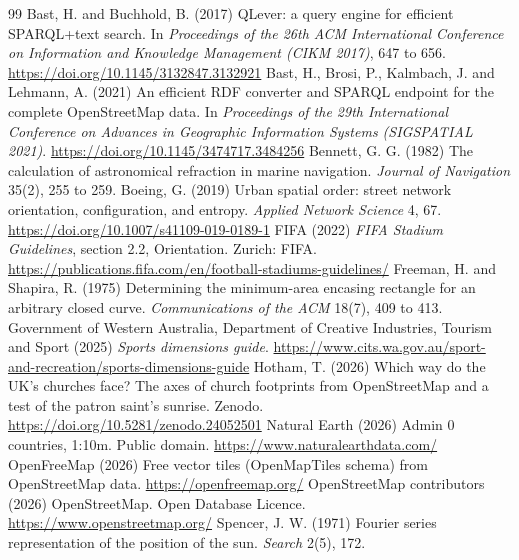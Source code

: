 \documentclass[11pt,a4paper]{article}
\begin{document}
\begin{thebibliography}{99}
 Bast, H. and Buchhold, B. (2017) QLever: a query engine for efficient SPARQL+text search. In \textit{Proceedings of the 26th ACM International Conference on Information and Knowledge Management (CIKM 2017)}, 647 to 656. \url{https://doi.org/10.1145/3132847.3132921}
 Bast, H., Brosi, P., Kalmbach, J. and Lehmann, A. (2021) An efficient RDF converter and SPARQL endpoint for the complete OpenStreetMap data. In \textit{Proceedings of the 29th International Conference on Advances in Geographic Information Systems (SIGSPATIAL 2021)}. \url{https://doi.org/10.1145/3474717.3484256}
 Bennett, G. G. (1982) The calculation of astronomical refraction in marine navigation. \textit{Journal of Navigation} 35(2), 255 to 259.
 Boeing, G. (2019) Urban spatial order: street network orientation, configuration, and entropy. \textit{Applied Network Science} 4, 67. \url{https://doi.org/10.1007/s41109-019-0189-1}
 FIFA (2022) \textit{FIFA Stadium Guidelines}, section 2.2, Orientation. Zurich: FIFA. \url{https://publications.fifa.com/en/football-stadiums-guidelines/}
 Freeman, H. and Shapira, R. (1975) Determining the minimum-area encasing rectangle for an arbitrary closed curve. \textit{Communications of the ACM} 18(7), 409 to 413.
 Government of Western Australia, Department of Creative Industries, Tourism and Sport (2025) \textit{Sports dimensions guide}. \url{https://www.cits.wa.gov.au/sport-and-recreation/sports-dimensions-guide}
 Hotham, T. (2026) Which way do the UK's churches face? The axes of church footprints from OpenStreetMap and a test of the patron saint's sunrise. Zenodo. \url{https://doi.org/10.5281/zenodo.24052501}
 Natural Earth (2026) Admin 0 countries, 1:10m. Public domain. \url{https://www.naturalearthdata.com/}
 OpenFreeMap (2026) Free vector tiles (OpenMapTiles schema) from OpenStreetMap data. \url{https://openfreemap.org/}
 OpenStreetMap contributors (2026) OpenStreetMap. Open Database Licence. \url{https://www.openstreetmap.org/}
 Spencer, J. W. (1971) Fourier series representation of the position of the sun. \textit{Search} 2(5), 172.
\end{thebibliography}
\end{document}
